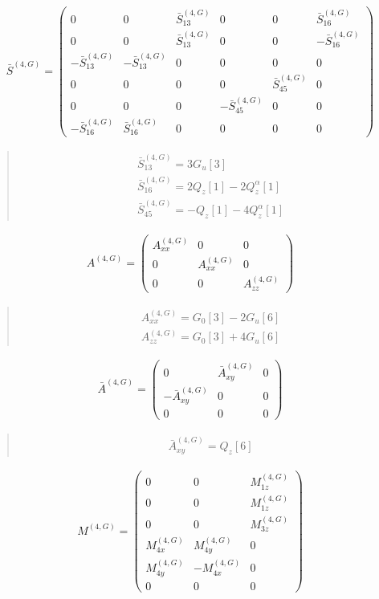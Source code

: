 \documentclass[fleqn,10pt]{jsarticle}
\begin{document}
\begin{align*}
\bar{S}^{(4,G)} = \begin{pmatrix} 0 & 0 & \bar{S}^{(4,G)}_{13} & 0 & 0 & \bar{S}^{(4,G)}_{16} \\ 0 & 0 & \bar{S}^{(4,G)}_{13} & 0 & 0 & - \bar{S}^{(4,G)}_{16} \\ - \bar{S}^{(4,G)}_{13} & - \bar{S}^{(4,G)}_{13} & 0 & 0 & 0 & 0 \\ 0 & 0 & 0 & 0 & \bar{S}^{(4,G)}_{45} & 0 \\ 0 & 0 & 0 & - \bar{S}^{(4,G)}_{45} & 0 & 0 \\ - \bar{S}^{(4,G)}_{16} & \bar{S}^{(4,G)}_{16} & 0 & 0 & 0 & 0 \end{pmatrix}
\end{align*}
\begin{quote}
\begin{align*}
& \bar{S}^{(4,G)}_{13} = 3 G_{u}[3] \\
& \bar{S}^{(4,G)}_{16} = 2 Q_{z}[1] - 2 Q_{z}^{\alpha}[1] \\
& \bar{S}^{(4,G)}_{45} = - Q_{z}[1] - 4 Q_{z}^{\alpha}[1]
\end{align*}
\end{quote}
\begin{align*}
A^{(4,G)} = \begin{pmatrix} A^{(4,G)}_{xx} & 0 & 0 \\ 0 & A^{(4,G)}_{xx} & 0 \\ 0 & 0 & A^{(4,G)}_{zz} \end{pmatrix}
\end{align*}
\begin{quote}
\begin{align*}
& A^{(4,G)}_{xx} = G_{0}[3] - 2 G_{u}[6] \\
& A^{(4,G)}_{zz} = G_{0}[3] + 4 G_{u}[6]
\end{align*}
\end{quote}
\begin{align*}
\bar{A}^{(4,G)} = \begin{pmatrix} 0 & \bar{A}^{(4,G)}_{xy} & 0 \\ - \bar{A}^{(4,G)}_{xy} & 0 & 0 \\ 0 & 0 & 0 \end{pmatrix}
\end{align*}
\begin{quote}
\begin{align*}
& \bar{A}^{(4,G)}_{xy} = Q_{z}[6]
\end{align*}
\end{quote}
\begin{align*}
M^{(4,G)} = \begin{pmatrix} 0 & 0 & M^{(4,G)}_{1z} \\ 0 & 0 & M^{(4,G)}_{1z} \\ 0 & 0 & M^{(4,G)}_{3z} \\ M^{(4,G)}_{4x} & M^{(4,G)}_{4y} & 0 \\ M^{(4,G)}_{4y} & - M^{(4,G)}_{4x} & 0 \\ 0 & 0 & 0 \end{pmatrix}
\end{align*}
\end{document}
